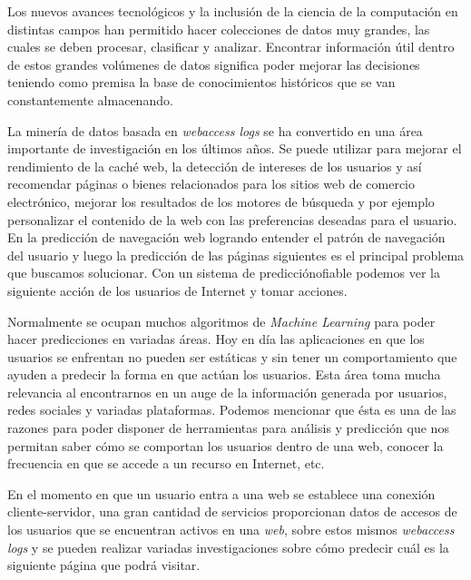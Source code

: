 {
Los nuevos avances tecnológicos y la inclusión de la ciencia de la computación en distintas campos han permitido hacer colecciones de datos muy grandes, las cuales se deben procesar, clasificar y analizar. Encontrar información útil dentro de estos grandes volúmenes de datos significa poder mejorar las decisiones teniendo como premisa la base de conocimientos históricos que se van constantemente almacenando.

La minería de datos basada en \emph{webaccess logs} se ha convertido en una área importante de investigación en los últimos años. Se puede utilizar para mejorar el rendimiento de la caché web, la detección de intereses de los usuarios y así recomendar páginas o bienes relacionados para los sitios web de comercio electrónico, mejorar los resultados de los motores de búsqueda y por ejemplo personalizar el contenido de la web con las preferencias deseadas para el usuario. En la predicción de navegación web logrando entender el patrón de navegación del usuario y luego la predicción de las páginas siguientes es el principal problema que buscamos solucionar. Con un sistema de predicciónofiable podemos ver la siguiente acción de los usuarios de Internet y tomar acciones. 


Normalmente se ocupan muchos algoritmos de \emph{Machine Learning} para poder hacer predicciones en variadas áreas. Hoy en día las aplicaciones en que los usuarios se enfrentan no pueden ser estáticas y sin tener un comportamiento que ayuden a predecir la forma en que actúan los usuarios. Esta área toma mucha relevancia al encontrarnos en un auge de la información generada por usuarios, redes sociales y variadas plataformas. Podemos mencionar que ésta es una de las razones para poder disponer de herramientas para análisis y predicción que nos permitan saber cómo se comportan los usuarios dentro de una web, conocer la frecuencia en que se accede a un recurso en Internet, etc. 

En el momento en que un usuario entra a una web se establece una conexión cliente-servidor, una gran cantidad de servicios proporcionan datos de accesos de los usuarios que se encuentran activos en una \emph{web}, sobre estos mismos \emph{webaccess logs} y se pueden realizar variadas investigaciones sobre cómo predecir cuál es la siguiente página que podrá visitar. 


}
